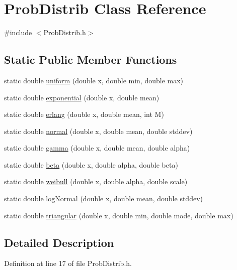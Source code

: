 \hypertarget{class_prob_distrib}{\section{Prob\-Distrib Class Reference}
\label{class_prob_distrib}
}


{\ttfamily \#include $<$Prob\-Distrib.\-h$>$}

\subsection*{Static Public Member Functions}
\begin{DoxyCompactItemize}
\item 
static double \hyperlink{class_prob_distrib_a4ff9f4d4faa1c29eb970c2629b332032}{uniform} (double x, double min, double max)
\item 
static double \hyperlink{class_prob_distrib_ad638ee57a1ad9ffe4a81e6f7607736a2}{exponential} (double x, double mean)
\item 
static double \hyperlink{class_prob_distrib_a479f7cbaef301482e924d57627675796}{erlang} (double x, double mean, int M)
\item 
static double \hyperlink{class_prob_distrib_a5ca4ebda2818070339b707a880e3d1a4}{normal} (double x, double mean, double stddev)
\item 
static double \hyperlink{class_prob_distrib_a2a5a2f10a9ba6475591597643b555ab9}{gamma} (double x, double mean, double alpha)
\item 
static double \hyperlink{class_prob_distrib_af74e5c70a59727220d52a7f445992b28}{beta} (double x, double alpha, double beta)
\item 
static double \hyperlink{class_prob_distrib_a74aadd83aaa5459d3a9dd534f6dce82a}{weibull} (double x, double alpha, double scale)
\item 
static double \hyperlink{class_prob_distrib_ad6e3ae223763aae5c2fe7d347523adbb}{log\-Normal} (double x, double mean, double stddev)
\item 
static double \hyperlink{class_prob_distrib_a057f5c5a97ab296f60b1a92ec1886162}{triangular} (double x, double min, double mode, double max)
\end{DoxyCompactItemize}


\subsection{Detailed Description}


Definition at line 17 of file Prob\-Distrib.\-h.



